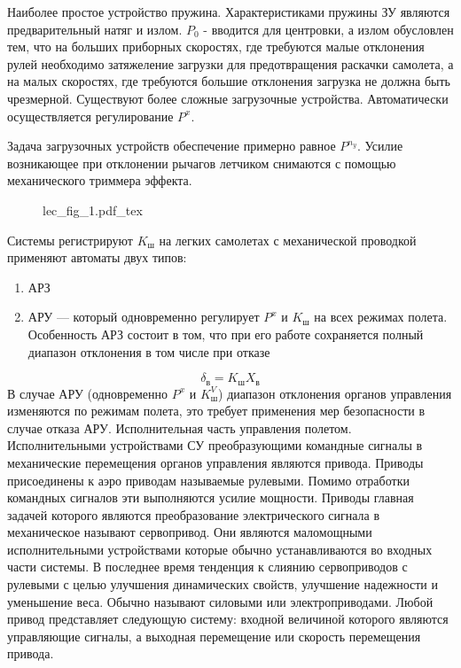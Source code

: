 \documentclass{article}
\begin{document}
Наиболее простое устройство пружина.
Характеристиками пружины ЗУ являются предварительный натяг и излом. $P_0$ -
вводится для центровки, а излом обусловлен тем, что на больших приборных
скоростях, где требуются малые отклонения рулей необходимо затяжеление загрузки
для предотвращения раскачки самолета, а на малых скоростях, где требуются
большие отклонения загрузка не должна быть чрезмерной. Существуют более сложные
загрузочные устройства. Автоматически осуществляется регулирование $P^{x}$.

Задача загрузочных устройств обеспечение примерно равное $P^{n_y}$. Усилие
возникающее при отклонении рычагов летчиком снимаются с помощью механического
триммера эффекта.
\begin{figure}[H]
	\centering
	{lec_fig_1.pdf_tex}
\end{figure}
Системы регистрируют $K_\text{ш}$ на легких самолетах с механической проводкой
применяют автоматы двух типов:
\begin{enumerate}
	\item АРЗ
	\item АРУ --- который одновременно регулирует $P^{x}$ и $K_\text{ш}$ на
	      всех режимах полета. Особенность АРЗ состоит в том, что при его работе
	      сохраняется полный диапазон отклонения в том числе при отказе
\end{enumerate}
\[
	\delta_\text{в} = K_\text{ш} X_\text{в}
\]
В случае АРУ (одновременно $P^{x}$ и $K_\text{ш}^V$) диапазон отклонения
органов управления изменяются по режимам полета, это требует применения мер
безопасности в случае отказа АРУ.
Исполнительная часть управления полетом.
Исполнительными устройствами СУ преобразующими командные сигналы в механические
перемещения органов управления являются привода. Приводы присоединены к аэро
приводам называемые рулевыми. Помимо отработки командных сигналов эти
выполняются усилие мощности. Приводы главная задачей которого являются
преобразование электрического сигнала в механическое называют сервопривод. Они
являются маломощными исполнительными устройствами которые обычно
устанавливаются во входных части системы. В последнее время тенденция к слиянию
сервоприводов с рулевыми с целью улучшения динамических свойств, улучшение
надежности и уменьшение веса. Обычно называют силовыми или электроприводами.
Любой привод представляет следующую систему: входной величиной которого
являются управляющие сигналы, а выходная перемещение или скорость перемещения
привода.
\end{document}
